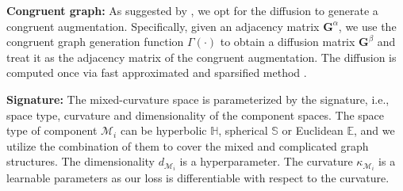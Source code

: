 
\noindent\textbf{Congruent graph:} 
As suggested by \citet{HassaniA20}, we opt for the diffusion to generate a congruent augmentation.
Specifically, given an adjacency matrix $\mathbf G^\alpha$, we use the congruent graph generation function \emph{$\Gamma(\cdot)$} to obtain a diffusion matrix $\mathbf G^\beta$  and treat it as the adjacency matrix of the congruent augmentation. 
The diffusion is computed once via fast approximated and sparsified method \cite{KlicperaWG19}.

\noindent\textbf{Signature:} The mixed-curvature space is parameterized by the signature, i.e., space type, curvature and dimensionality of the component spaces.
The space type of component $\mathcal M_i$ can be hyperbolic $\mathbb H$, spherical $\mathbb S$ or Euclidean $\mathbb E$, and we utilize the combination of them to cover the mixed and complicated graph structures.
The dimensionality $d_{\mathcal M_i}$ is a hyperparameter.
The curvature $\kappa_{\mathcal M_i}$ is a learnable parameters as our loss is differentiable with respect to the curvature. 

